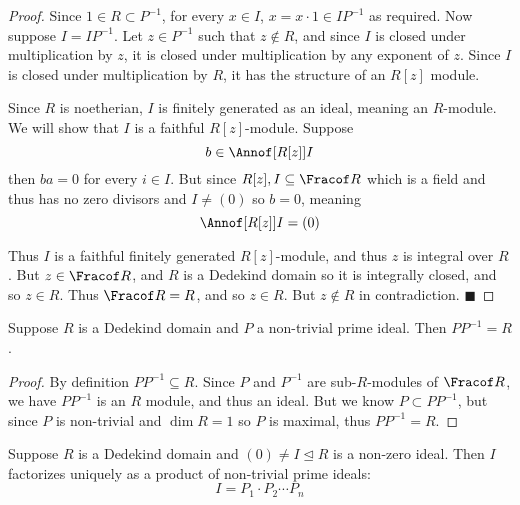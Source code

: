 \documentclass[10pt]{article}
\let\ideal=\trianglelefteq
\def\qed{%
    \ifmmode%
        \eqno\blacksquare%
    \else%
        \hskip1cm\allowbreak\hbox{}\nobreak\hfill$\blacksquare$%
    \fi%
}
\begin{document}
\begin{proof}

    Since $1\in R\subset P^{-1}$, for every $x\in I$, $x=x\cdot1\in IP^{-1}$ as required.
    Now suppose $I=IP^{-1}$.
    Let $z\in P^{-1}$ such that $z\notin R$, and since $I$ is closed under multiplication by $z$, it is closed under multiplication by any exponent of $z$.
    Since $I$ is closed under multiplication by $R$, it has the structure of an $R[z]$ module.

    Since $R$ is noetherian, $I$ is finitely generated as an ideal, meaning an $R$-module.
    We will show that $I$ is a faithful $R[z]$-module.
    Suppose
    \[ b\in\Annof[{R[z]}]I \]
    then $ba=0$ for every $i\in I$.
    But since $R[z],I\subseteq\Fracof R$ which is a field and thus has no zero divisors and $I\neq(0)$ so $b=0$, meaning
    \[ \Annof[{R[z]}]I = (0) \]

    Thus $I$ is a faithful finitely generated $R[z]$-module, and thus $z$ is integral over $R$.
    But $z\in\Fracof R$, and $R$ is a Dedekind domain so it is integrally closed, and so $z\in R$.
    Thus $\Fracof R=R$, and so $z\in R$.
    But $z\notin R$ in contradiction.
    \qed

\end{proof}

\begin{lemm*}

    Suppose $R$ is a Dedekind domain and $P$ a non-trivial prime ideal.
    Then $PP^{-1}=R$.

\end{lemm*}

\begin{proof}

    By definition $PP^{-1}\subseteq R$.
    Since $P$ and $P^{-1}$ are sub-$R$-modules of $\Fracof R$, we have $PP^{-1}$ is an $R$ module, and thus an ideal.
    But we know $P\subset PP^{-1}$, but since $P$ is non-trivial and $\dim R=1$ so $P$ is maximal, thus $PP^{-1}=R$.

\end{proof}

\begin{thrm*}

    Suppose $R$ is a Dedekind domain and $(0)\neq I\ideal R$ is a non-zero ideal.
    Then $I$ factorizes uniquely as a product of non-trivial prime ideals:
    \[ I = P_1\cdot P_2\cdots P_n \]

\end{thrm*}
\end{document}

